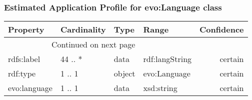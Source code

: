 \documentclass[10pt,a4paper,titlepage,final]{article}
\begin{document}
\subsubsection{Estimated Application Profile for evo:Language class}
\begin{tabularx}{\textwidth}{lllXr}
\toprule
     Property & Cardinality &    Type &           Range & Confidence \\
\midrule
\endhead
\midrule
\multicolumn{3}{r}{{Continued on next page}} \\
\midrule
\endfoot

\bottomrule
\endlastfoot
   rdfs:label &     44 .. * &    data &  rdf:langString &    certain \\
     rdf:type &      1 .. 1 &  object &    evo:Language &    certain \\
 evo:language &      1 .. 1 &    data &      xsd:string &    certain \\
\end{tabularx}
\end{document}
